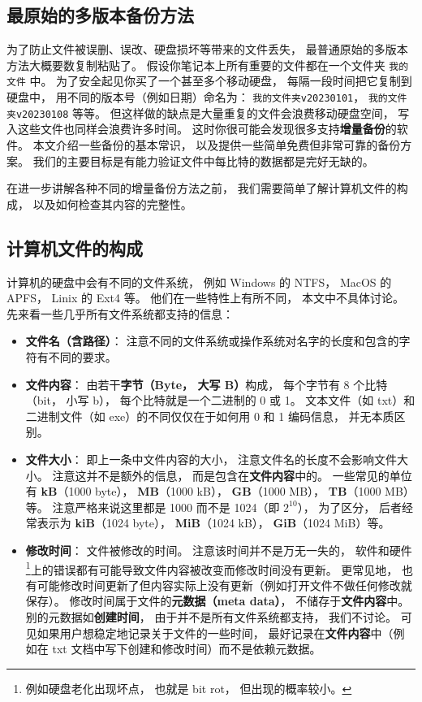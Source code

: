 
\subsection{最原始的多版本备份方法}
为了防止文件被误删、误改、硬盘损坏等带来的文件丢失， 最普通原始的多版本方法大概要数复制粘贴了。 假设你笔记本上所有重要的文件都在一个文件夹 \verb|我的文件| 中。 为了安全起见你买了一个甚至多个移动硬盘， 每隔一段时间把它复制到硬盘中， 用不同的版本号（例如日期）命名为： \verb|我的文件夹v20230101|， \verb|我的文件夹v20230108| 等等。 但这样做的缺点是大量重复的文件会浪费移动硬盘空间， 写入这些文件也同样会浪费许多时间。 这时你很可能会发现很多支持\textbf{增量备份}的软件。 本文介绍一些备份的基本常识， 以及提供一些简单免费但非常可靠的备份方案。 我们的主要目标是有能力验证文件中每比特的数据都是完好无缺的。

在进一步讲解各种不同的增量备份方法之前， 我们需要简单了解计算机文件的构成， 以及如何检查其内容的完整性。

\subsection{计算机文件的构成}
计算机的硬盘中会有不同的文件系统， 例如 Windows 的 NTFS， MacOS 的 APFS， Linix 的 Ext4 等。 他们在一些特性上有所不同， 本文中不具体讨论。 先来看一些几乎所有文件系统都支持的信息：
\begin{itemize}
\item \textbf{文件名（含路径）}： 注意不同的文件系统或操作系统对名字的长度和包含的字符有不同的要求。
\item \textbf{文件内容}： 由若干\textbf{字节（Byte， 大写 B）}构成， 每个字节有 8 个比特（bit， 小写 b）， 每个比特就是一个二进制的 0 或 1。 文本文件（如 txt）和二进制文件（如 exe）的不同仅仅在于如何用 0 和 1 编码信息， 并无本质区别。
\item \textbf{文件大小}： 即上一条中文件内容的大小， 注意文件名的长度不会影响文件大小。 注意这并不是额外的信息， 而是包含在\textbf{文件内容}中的。 一些常见的单位有 \textbf{kB}（1000 byte）， \textbf{MB}（1000 kB）， \textbf{GB}（1000 MB）， \textbf{TB}（1000 MB）等。 注意严格来说这里都是 1000 而不是 1024（即 $2^{10}$）， 为了区分， 后者经常表示为 \textbf{kiB}（1024 byte）， \textbf{MiB}（1024 kB）， \textbf{GiB}（1024 MiB）等。
\item \textbf{修改时间}： 文件被修改的时间。 注意该时间并不是万无一失的， 软件和硬件\footnote{例如硬盘老化出现坏点， 也就是 bit rot， 但出现的概率较小。}上的错误都有可能导致文件内容被改变而修改时间没有更新。 更常见地， 也有可能修改时间更新了但内容实际上没有更新（例如打开文件不做任何修改就保存）。 修改时间属于文件的\textbf{元数据（meta data）}， 不储存于\textbf{文件内容}中。 别的元数据如\textbf{创建时间}， 由于并不是所有文件系统都支持， 我们不讨论。 可见如果用户想稳定地记录关于文件的一些时间， 最好记录在\textbf{文件内容}中（例如在 txt 文档中写下创建和修改时间）而不是依赖元数据。
\end{itemize}

